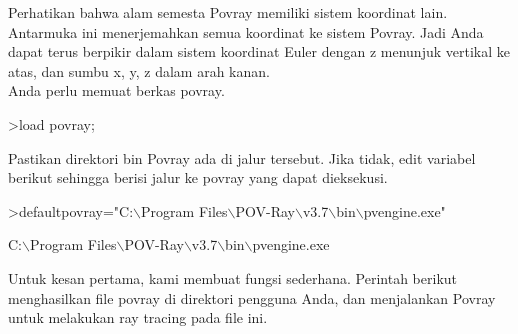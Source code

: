 \documentclass[a4paper,10pt]{article}
\begin{document}
\begin{eulernotebook}
\begin{eulercomment}
\begin{eulercomment}
\begin{eulercomment}
\begin{eulercomment}
\begin{eulercomment}
\begin{eulercomment}
\begin{eulercomment}
\begin{eulercomment}
\begin{eulercomment}
\begin{eulercomment}
\begin{eulercomment}
\begin{eulercomment}
\begin{eulercomment}
\begin{eulercomment}
\begin{eulercomment}
\begin{eulercomment}
\begin{eulercomment}
Perhatikan bahwa alam semesta Povray memiliki sistem koordinat lain.
Antarmuka ini menerjemahkan semua koordinat ke sistem Povray. Jadi
Anda dapat terus berpikir dalam sistem koordinat Euler dengan z
menunjuk vertikal ke atas, dan sumbu x, y, z dalam arah kanan.\\
Anda perlu memuat berkas povray.
\end{eulercomment}
\begin{eulerprompt}
>load povray;
\end{eulerprompt}
\begin{eulercomment}
Pastikan direktori bin Povray ada di jalur tersebut. Jika tidak, edit
variabel berikut sehingga berisi jalur ke povray yang dapat
dieksekusi.
\end{eulercomment}
\begin{eulerprompt}
>defaultpovray="C:\(\backslash\)Program Files\(\backslash\)POV-Ray\(\backslash\)v3.7\(\backslash\)bin\(\backslash\)pvengine.exe"
\end{eulerprompt}
\begin{euleroutput}
  C:\(\backslash\)Program Files\(\backslash\)POV-Ray\(\backslash\)v3.7\(\backslash\)bin\(\backslash\)pvengine.exe
\end{euleroutput}
\begin{eulercomment}
Untuk kesan pertama, kami membuat fungsi sederhana. Perintah berikut
menghasilkan file povray di direktori pengguna Anda, dan menjalankan
Povray untuk melakukan ray tracing pada file ini.


\end{eulercomment}
\end{eulercomment}
\end{eulercomment}
\end{eulercomment}
\end{eulercomment}
\end{eulercomment}
\end{eulercomment}
\end{eulercomment}
\end{eulercomment}
\end{eulercomment}
\end{eulercomment}
\end{eulercomment}
\end{eulercomment}
\end{eulercomment}
\end{eulercomment}
\end{eulercomment}
\end{eulercomment}
\end{eulernotebook}
\end{document}
